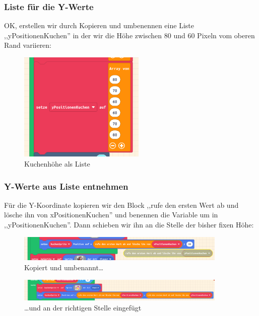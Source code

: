 \documentclass{beamer}
\begin{document}
\begin{frame}
 \frametitle{Liste für die Y-Werte}
 
OK, erstellen wir durch Kopieren und umbenennen eine Liste ,,yPositionenKuchen'' in der wir die Höhe zwischen 80 und 60 Pixeln vom oberen Rand variieren:
 
\begin{figure}
  \includegraphics[width=6cm]{game46.png}
  \caption{Kuchenhöhe als Liste}
  \label{fig:game46}
\end{figure}
\end{frame}


\begin{frame}
 \frametitle{Y-Werte aus Liste entnehmen}
 
Für die Y-Koordinate kopieren wir den Block ,,rufe den ersten Wert ab und lösche ihn von xPositionenKuchen'' und benennen die Variable um in ,,yPositionenKuchen''. Dann schieben wir ihn an die Stelle der bisher fixen Höhe:
 
\begin{figure}
  \includegraphics[width=10cm]{game47.png}
  \caption{Kopiert und umbenannt…}
  \label{fig:game47}
\end{figure}
\begin{figure}
  \includegraphics[width=10cm]{game48.png}
  \caption{…und an der richtigen Stelle eingefügt}
  \label{fig:game48}
\end{figure}

\end{frame}
\end{document}
